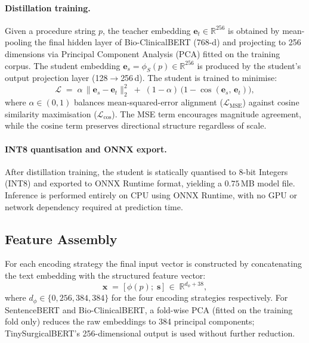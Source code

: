 \paragraph{Distillation training.}
Given a procedure string $p$, the teacher embedding $\mathbf{e}_t \in \mathbb{R}^{256}$ is obtained by mean-pooling the final hidden layer of Bio-ClinicalBERT (768-d) and projecting to 256 dimensions via Principal Component Analysis (PCA) fitted on the training corpus. The student embedding $\mathbf{e}_s = \phi_S(p) \in \mathbb{R}^{256}$ is produced by the student's output projection layer (128$\to$256\,d). The student is trained to minimise:
\begin{equation}
  \mathcal{L} \;=\;
    \alpha\,\bigl\lVert \mathbf{e}_s - \mathbf{e}_t \bigr\rVert_2^2
    \;+\;
    (1-\alpha)\,\bigl(1 - \cos(\mathbf{e}_s,\,\mathbf{e}_t)\bigr),
  \label{eq:kd_loss}
\end{equation}
where $\alpha \in (0,1)$ balances mean-squared-error alignment ($\mathcal{L}_{\mathrm{MSE}}$) against cosine similarity maximisation ($\mathcal{L}_{\mathrm{cos}}$). The MSE term encourages magnitude agreement, while the cosine term preserves directional structure regardless of scale.

\paragraph{INT8 quantisation and ONNX export.}
After distillation training, the student is statically quantised to 8-bit Integers (INT8) and exported to ONNX Runtime format, yielding a $0.75\,$MB model file. Inference is performed entirely on CPU using ONNX Runtime, with no GPU or network dependency required at prediction time.

\subsection{Feature Assembly}
\label{sec:assembly}

For each encoding strategy the final input vector is constructed by concatenating the text embedding with the structured feature vector:
\begin{equation}
  \mathbf{x} \;=\; \bigl[\,\phi(p);\;\mathbf{s}\,\bigr] \;\in\; \mathbb{R}^{d_\phi + 38},
  \label{eq:concat}
\end{equation}
where $d_\phi \in \{0, 256, 384, 384\}$ for the four encoding strategies respectively. For SentenceBERT and Bio-ClinicalBERT, a fold-wise PCA (fitted on the training fold only) reduces the raw embeddings to 384 principal components; TinySurgicalBERT's 256-dimensional output is used without further reduction.

